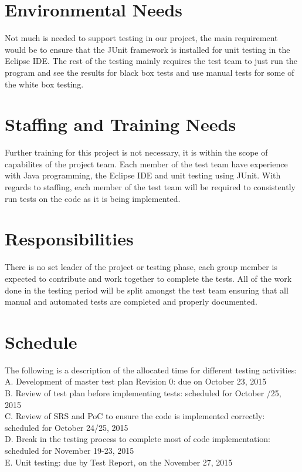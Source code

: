 \documentclass[12pt, letterpaper]{article}
\begin{document}
	\section{Environmental Needs}
	\indent \indent Not much is needed to support testing in our project, the main requirement would be to ensure that the JUnit framework is installed for unit testing in the Eclipse IDE. The rest of the testing mainly requires the test team to just run the program and see the results for black box tests and use manual tests for some of the white box testing.
	
	\section{Staffing and Training Needs}
	\indent \indent Further training for this project is not necessary, it is within the scope of capabilites of the project team. Each member of the test team have experience with Java programming, the Eclipse IDE and unit testing using JUnit. With regards to staffing, each member of the test team will be required to consistently run tests on the code as it is being implemented.
	
	\section{Responsibilities}
	\indent \indent There is no set leader of the project or testing phase, each group member is expected to contribute and work together to complete the tests. All of the work done in the testing period will be split amongst the test team ensuring that all manual and automated tests are completed and properly documented.
	
	\section{Schedule}
	The following is a description of the allocated time for different testing activities:\\
	
	\noindent A. \indent Development of master test plan Revision 0: due on October 23, 2015\\
	\noindent B. \indent Review of test plan before implementing tests: scheduled for October \indent {}/25, 2015\\
	\noindent C. \indent Review of SRS and PoC to ensure the code is implemented correctly: \indent \indent scheduled for October 24/25, 2015\\
	\noindent D. \indent Break in the testing process to complete most of code implementation: \indent \indent scheduled for November 19-23,  2015\\
	\noindent E. \indent Unit testing: due by Test Report, on the November 27, 2015
	
\end{document}
